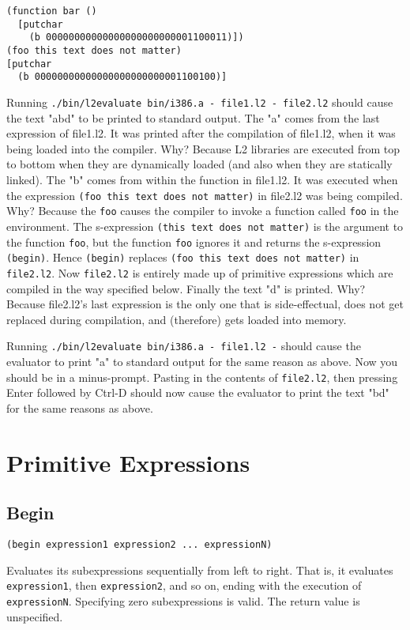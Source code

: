 \documentclass[twocolumn,landscape]{article}
\begin{document}
      \begin{lstlisting}[caption={file2.l2}]
(function bar ()
  [putchar
    (b 00000000000000000000000001100011)])
(foo this text does not matter)
[putchar
  (b 00000000000000000000000001100100)]
      \end{lstlisting}
      Running \lstinline{./bin/l2evaluate bin/i386.a - file1.l2 - file2.l2} should cause the text "abd" to be printed to standard output. The "a" comes from the last expression of file1.l2. It was printed after the compilation of file1.l2, when it was being loaded into the compiler. Why? Because L2 libraries are executed from top to bottom when they are dynamically loaded (and also when they are statically linked). The "b" comes from within the function in file1.l2. It was executed when the expression \lstinline{(foo this text does not matter)} in file2.l2 was being compiled. Why? Because the \lstinline{foo} causes the compiler to invoke a function called \lstinline{foo} in the environment. The s-expression \lstinline{(this text does not matter)} is the argument to the function \lstinline{foo}, but the function \lstinline{foo} ignores it and returns the s-expression \lstinline{(begin)}. Hence \lstinline{(begin)} replaces \lstinline{(foo this text does not matter)} in \lstinline{file2.l2}. Now \lstinline{file2.l2} is entirely made up of primitive expressions which are compiled in the way specified below. Finally the text "d" is printed. Why? Because file2.l2's last expression is the only one that is side-effectual, does not get replaced during compilation, and (therefore) gets loaded into memory.

      Running \lstinline{./bin/l2evaluate bin/i386.a - file1.l2 -} should cause the evaluator to print "a" to standard output for the same reason as above. Now you should be in a minus-prompt. Pasting in the contents of \lstinline{file2.l2}, then pressing Enter followed by Ctrl-D should now cause the evaluator to print the text "bd" for the same reasons as above.

  \section{Primitive Expressions}
    \subsection{Begin}\label{sec:begin}
      \begin{lstlisting}
(begin expression1 expression2 ... expressionN)
      \end{lstlisting}
      Evaluates its subexpressions sequentially from left to right. That is, it evaluates \lstinline{expression1}, then \lstinline{expression2}, and so on, ending with the execution of \lstinline{expressionN}. Specifying zero subexpressions is valid. The return value is unspecified.
\end{document}
